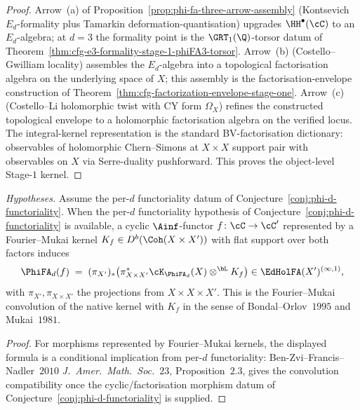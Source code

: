 \begin{proof}
Arrow~(a) of Proposition~\ref{prop:phi-fa-three-arrow-assembly} (Kontsevich $E_d$-formality plus Tamarkin deformation-quantisation) upgrades $\HH^\bullet(\cC)$ to an $E_d$-algebra; at $d=3$ the formality point is the $\GRT_1(\Q)$-torsor datum of Theorem~\ref{thm:cfg-e3-formality-stage-1-phiFA3-torsor}. Arrow~(b) (Costello--Gwilliam locality) assembles the $E_d$-algebra into a topological factorisation algebra on the underlying space of $X$; this assembly is the factorisation-envelope construction of Theorem~\ref{thm:cfg-factorization-envelope-stage-one}. Arrow~(c) (Costello--Li holomorphic twist with CY form $\Omega_X$) refines the constructed topological envelope to a holomorphic factorisation algebra on the verified locus. The integral-kernel representation is the standard BV-factorisation dictionary: observables of holomorphic Chern--Simons at $X \times X$ support pair with observables on $X$ via Serre-duality pushforward. This proves the object-level Stage-$1$ kernel.
\end{proof}

\begin{proposition}
\label{prop:phifa-infty1-morphism-kernel-conditional}
\noindent\emph{Hypotheses.} Assume the per-$d$ functoriality datum of Conjecture~\ref{conj:phi-d-functoriality}.
When the per-$d$ functoriality hypothesis of
Conjecture~\ref{conj:phi-d-functoriality} is available, a cyclic
$\Ainf$-functor $f \colon \cC \to \cC'$ represented by a
Fourier--Mukai kernel $K_f \in D^b(\Coh(X \times X'))$ with flat support
over both factors induces
\[
 \PhiFA_d(f) \;=\; (\pi_{X'})_* \bigl(\pi_{X \times X'}^* \cK_{\PhiFA_d}(X) \otimes^{\bL} K_f\bigr) \in \EdHolFA(X')^{(\infty,1)},
\]
with $\pi_{X'}, \pi_{X \times X'}$ the projections from
$X \times X \times X'$. This is the Fourier--Mukai convolution of the
native kernel with $K_f$ in the sense of Bondal--Orlov~$1995$ and
Mukai~$1981$.
\end{proposition}

\begin{proof}
For morphisms represented by Fourier--Mukai kernels, the displayed
formula is a conditional implication from per-$d$ functoriality:
Ben-Zvi--Francis--Nadler~$2010$ \textit{J.~Amer.~Math.~Soc.}~$23$,
Proposition~$2.3$, gives the convolution compatibility once the
cyclic/factorisation morphism datum of
Conjecture~\ref{conj:phi-d-functoriality} is supplied.
\end{proof}

